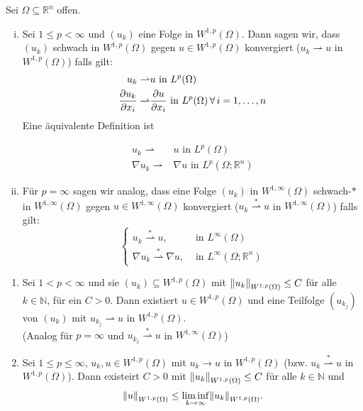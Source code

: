 \begin{definition*} Sei $\Omega \subseteq \mathbb{R}^n$ offen.
	\begin{enumerate}[(i)]
		\item Sei $1 \leq p < \infty$ und $(u_k)$ eine Folge in $W^{1,p}(\Omega)$. Dann sagen wir, dass $(u_k)$ schwach in $W^{1,p}(\Omega)$ gegen $u \in W^{1,p}(\Omega)$ konvergiert ($u_k \rightharpoonup u$ in $W^{1,p}(\Omega)$) falls gilt:
		\begin{align*}
			u_k \rightharpoonup& u \text{ in } L^p(\Omega) \\
			\frac{{\partial u_k}}{{\partial x_i}}  \rightharpoonup& \frac{{\partial u}}{{\partial x_i}}  \text{ in }L^p(\Omega) \, \forall\, i=1,\dots,n
		\end{align*}
		Eine äquivalente Definition ist
		
			\begin{align*}
				u_k \rightharpoonup& u \text{ in } L^p(\Omega) \\
				 \nabla u_k \rightharpoonup&  \nabla u \text{ in }L^p(\Omega;\mathbb{R}^n) 
			\end{align*}

		\item Für $p= \infty$ sagen wir analog, dass eine Folge $(u_k)$ in $W^{1,\infty}(\Omega)$ schwach-$*$ in $W^{1,\infty}(\Omega)$ gegen $u \in W^{1,\infty}(\Omega)$ konvergiert ($u_k \stackrel{*}{\rightharpoonup} u$ in $W^{1,\infty}(\Omega)$) falls gilt:
		\[
			\begin{cases}
				u_k \stackrel{*}{\rightharpoonup}u, &\text{ in }L^{\infty}(\Omega)\\
				 \nabla u_k \stackrel{*}{\rightharpoonup}  \nabla u, &\text{ in }L^{\infty}(\Omega;\mathbb{R}^n)
			\end{cases}
		\]
	\end{enumerate}
\end{definition*}
\begin{satz}
	\begin{enumerate}[1)]
		\item Sei $1 < p < \infty$ und sie $(u_k) \subseteq W^{1,p}(\Omega)$ mit $\norm{u_k}_{W^{1,p}(\Omega)} \leq C$ für alle $k \in \mathbb{N}$, für ein $C>0$. 
		Dann existiert $u \in W^{1,p}(\Omega)$ und eine Teilfolge $(u_{k_j})$ von $(u_k)$ mit $u_{k_j} \rightharpoonup u$ in $W^{1,p}(\Omega)$. \\
		(Analog für $p = \infty$ und $u_{k_j} \stackrel{*}{\rightharpoonup} u$ in $W^{1,\infty}(\Omega)$)
		\item Sei $1 \leq p \leq \infty$, $u_k,u \in W^{1,p}(\Omega)$ mit $u_k \to u$ in $W^{1,p}(\Omega)$ (bzw. $u_k \stackrel{*}{\rightharpoonup} u$ in $W^{1,p}(\Omega)$). Dann existeirt $C>0$ mit $\norm{u_k}_{W^{1,p}(\Omega)} \leq C$ für alle $k \in \mathbb{N}$ und 
		\[
			\norm{u}_{W^{1,p}(\Omega)} \leq \liminf_{k \to \infty} \norm{u_k}_{W^{1,p}(\Omega)}.
		\]
	\end{enumerate}
\end{satz}
